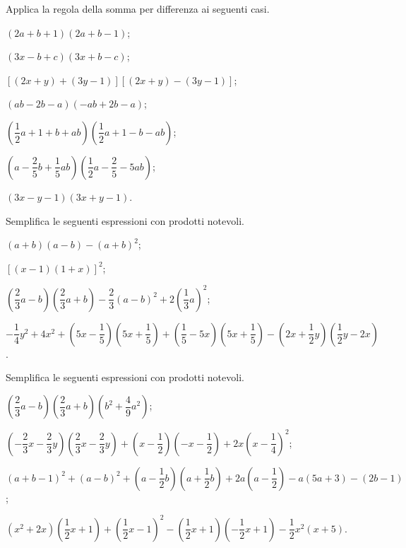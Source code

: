 \begin{esercizio}[\Ast]
 \label{ese:12.21}
Applica la regola della somma per differenza ai seguenti casi.

\begin{enumeratea}
\item $(2a+b+1)(2a+b-1)$;
\item $(3x-b+c)(3x+b-c)$;
\item $\left[(2x+y)+(3y-1)\right]\left[(2x+y)-(3y-1)\right]$;
\item $(ab-2b-a)(-{ab}+2b-a)$;
\item $\left(\dfrac{1}{2}a+1+b+ab\right)\left(\dfrac{1}{2}a+1-b-ab\right)$;
\item $\left(a-\dfrac{2}{5}b+\dfrac{1}{5}{ab}\right)\left(\dfrac{1}{2}a-\dfrac{2}{5}-5{ab}\right)$;
\item $(3x-y-1)(3x+y-1)$.
\end{enumeratea}
\end{esercizio}

\begin{esercizio}[\Ast]
 \label{ese:12.22}
Semplifica le seguenti espressioni con prodotti notevoli.
 \begin{enumeratea}
 \item $(a+b)(a-b)-(a+b)^{2}$;
 \item $[(x-1)(1+x)]^{2}$;
 \item $\left(\dfrac{2}{3}a-b\right)\left(\dfrac{2}{3}a+b\right)-\dfrac{2}{3}(a-b)^{2}+2\left(\dfrac{1}{3}a\right)^{2}$;
 \item 
 $-\dfrac{1}{4}y^{2}+4x^{2}+\left(5x-\dfrac{1}{5}\right)\left(5x+\dfrac{1}{5}\right)+\left(\dfrac{1}{5}-5x\right)\left(5x+\dfrac{1}{5}\right)-\left(2x+\dfrac{1}{2}y\right)\left(\dfrac{1}{2}y-2x\right)$.
 \end{enumeratea}
\end{esercizio}

\begin{esercizio}[\Ast]
 \label{ese:12.23}
Semplifica le seguenti espressioni con prodotti notevoli.

 \begin{enumeratea}
 \item $\left(\dfrac{2}{3}a-b\right)\left(\dfrac{2}{3}a+b\right)\left(b^{2}+\dfrac{4}{9}a^{2}\right)$;
 \item $\left(-{\dfrac{2}{3}x-\dfrac{2}{3}y}\right)\left(\dfrac{2}{3}x-\dfrac{2}{3}y\right)+\left(x-\dfrac{1}{2}\right)\left(-x-\dfrac{1}{2}\right)+2x\left(x-\dfrac{1}{4}\right)^{2}$;
 \item $(a+b-1)^{2}+(a-b)^{2}+\left(a-\dfrac{1}{2}b\right)\left(a+\dfrac{1}{2}b\right)+2a\left(a-\dfrac{1}{2}\right)-a(5a+3)-(2b-1)$;
 \item $\left(x^{2}+2x\right)\left(\dfrac{1}{2}x+1\right)+\left(\dfrac{1}{2}x-1\right)^{2}-\left(\dfrac{1}{2}x+1\right)\left(-{\dfrac{1}{2}}x+1\right)-\dfrac{1}{2}x^{2}(x+5)$.
\end{enumeratea}
\end{esercizio}

